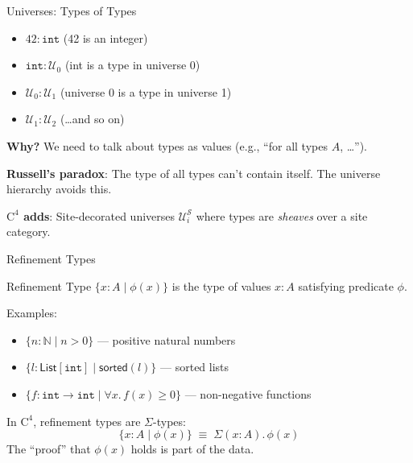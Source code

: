 \documentclass[aspectratio=169,11pt]{beamer}
\newcommand{\Cfour}{\mathrm{C}^4}
\newcommand{\site}{\mathcal{S}}
\begin{document}
\begin{frame}{Universes: Types of Types}
\begin{itemize}
\item $42 : \mathtt{int}$ \quad (42 is an integer)
\item $\mathtt{int} : \mathcal{U}_0$ \quad (int is a type in universe 0)
\item $\mathcal{U}_0 : \mathcal{U}_1$ \quad (universe 0 is a type in universe 1)
\item $\mathcal{U}_1 : \mathcal{U}_2$ \quad (\ldots and so on)
\end{itemize}

\vspace{0.5em}
\textbf{Why?} We need to talk about types as values
(e.g., ``for all types $A$, \ldots'').

\textbf{Russell's paradox}: The type of all types can't contain itself.
The universe hierarchy avoids this.

\vspace{0.5em}
\textbf{$\Cfour$ adds}: Site-decorated universes $\mathcal{U}_i^\site$
where types are \emph{sheaves} over a site category.
\end{frame}

\begin{frame}{Refinement Types}
\begin{block}{Refinement Type}
$\{x : A \mid \phi(x)\}$ is the type of values $x : A$ satisfying
predicate $\phi$.
\end{block}

Examples:
\begin{itemize}
\item $\{n : \mathbb{N} \mid n > 0\}$ --- positive natural numbers
\item $\{l : \mathsf{List}[\mathtt{int}] \mid \mathsf{sorted}(l)\}$ --- sorted lists
\item $\{f : \mathtt{int} \to \mathtt{int} \mid \forall x.\, f(x) \geq 0\}$ --- non-negative functions
\end{itemize}

\vspace{0.5em}
In $\Cfour$, refinement types are $\Sigma$-types:
\[
  \{x : A \mid \phi(x)\} \;\equiv\; \Sigma(x : A).\, \phi(x)
\]
The ``proof'' that $\phi(x)$ holds is part of the data.
\end{frame}
\end{document}
